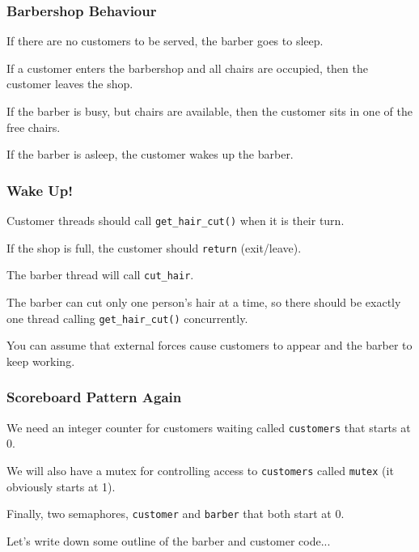 \begin{frame}
	\frametitle{Barbershop Behaviour}

	If there are no customers to be served, the barber goes to sleep.

	If a customer enters the barbershop and all chairs are occupied, then the customer leaves the shop.

	If the barber is busy, but chairs are available, then the customer sits in one of the free chairs.

	If the barber is asleep, the customer wakes up the barber.

\end{frame}

\begin{frame}
	\frametitle{Wake Up!}

	Customer threads should call \texttt{get\_hair\_cut()} when it is their turn.

	If the shop is full, the customer should \texttt{return} (exit/leave).

	The barber thread will call \texttt{cut\_hair}.

	The barber can cut only one person's hair at a time, so there should be exactly one thread calling \texttt{get\_hair\_cut()} concurrently.

	You can assume that external forces cause customers to appear and the barber to keep working.

\end{frame}


\begin{frame}
	\frametitle{Scoreboard Pattern Again}


	We need an integer counter for customers waiting called \texttt{customers} that starts at 0.

	We will also have a mutex for controlling access to \texttt{customers} called \texttt{mutex} (it obviously starts at 1).

	Finally, two semaphores, \texttt{customer} and \texttt{barber} that both start at 0.

	Let's write down some outline of the barber and customer code...

\end{frame}


